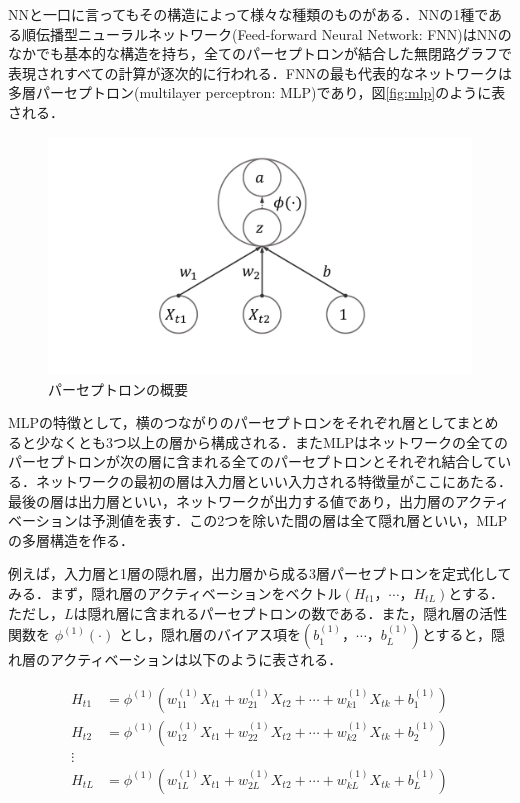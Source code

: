 \documentclass[a4paper，12pt]{jsarticle}
\begin{document}
NNと一口に言ってもその構造によって様々な種類のものがある．NNの1種である順伝播型ニューラルネットワーク(Feed-forward Neural Network: FNN)はNNのなかでも基本的な構造を持ち，全てのパーセプトロンが結合した無閉路グラフで表現されすべての計算が逐次的に行われる．FNNの最も代表的なネットワークは多層パーセプトロン(multilayer perceptron: MLP)であり，図\ref{fig:mlp}のように表される．

\begin{figure}[htbp]
  \centering
  \includegraphics[width=12cm]{./img/_ann_unit.pdf}
  \caption{パーセプトロンの概要}
  \label{fig:perceptron}
\end{figure}

MLPの特徴として，横のつながりのパーセプトロンをそれぞれ層としてまとめると少なくとも3つ以上の層から構成される．またMLPはネットワークの全てのパーセプトロンが次の層に含まれる全てのパーセプトロンとそれぞれ結合している．ネットワークの最初の層は入力層といい入力される特徴量がここにあたる．最後の層は出力層といい，ネットワークが出力する値であり，出力層のアクティベーションは予測値を表す．この2つを除いた間の層は全て隠れ層といい，MLPの多層構造を作る．

例えば，入力層と1層の隠れ層，出力層から成る3層パーセプトロンを定式化してみる．まず，隠れ層のアクティベーションをベクトル$(H_{t1}，\cdots，H_{tL})$とする．ただし，$L$は隠れ層に含まれるパーセプトロンの数である．また，隠れ層の活性関数を $\phi^{(1)}(\cdot)$ とし，隠れ層のバイアス項を$(b^{(1)}_1，\cdots，b^{(1)}_L)$とすると，隠れ層のアクティベーションは以下のように表される．

\begin{equation}
  \begin{split}
    H_{t1} &= \phi^{(1)} \left( w^{(1)}_{11} X_{t1} + w^{(1)}_{21} X_{t2} + \cdots + w^{(1)}_{k1} X_{tk} + b^{(1)}_1 \right) \\
    H_{t2} &= \phi^{(1)} \left( w^{(1)}_{12} X_{t1} + w^{(1)}_{22} X_{t2} + \cdots + w^{(1)}_{k2} X_{tk} + b^{(1)}_2 \right) \\
    \vdots \\
    H_{tL} &= \phi^{(1)} \left( w^{(1)}_{1L} X_{t1} + w^{(1)}_{2L} X_{t2} + \cdots + w^{(1)}_{kL} X_{tk} + b^{(1)}_L \right) \\
  \end{split}
\end{equation}
\end{document}
